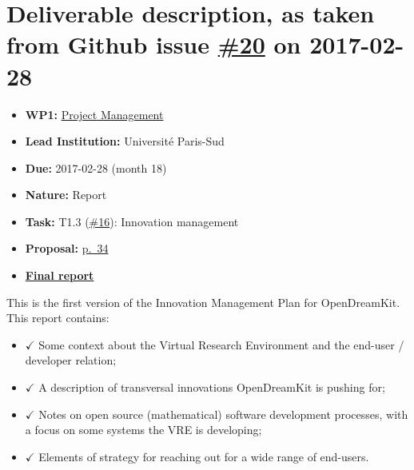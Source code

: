 \section*{\texorpdfstring{Deliverable description, as taken from Github
issue
\href{https://github.com/OpenDreamKit/OpenDreamKit/issues/20}{\#20} on
2017-02-28}{Deliverable description, as taken from Github issue \#20 on 2017-02-28}}\label{deliverable-description-as-taken-from-github-issue-20-on-2017-02-28}

\begin{itemize}
\tightlist
\item
  \textbf{WP1:}
  \href{https://github.com/OpenDreamKit/OpenDreamKit/tree/master/WP1}{Project
  Management}
\item
  \textbf{Lead Institution:} Université Paris-Sud
\item
  \textbf{Due:} 2017-02-28 (month 18)
\item
  \textbf{Nature:} Report
\item
  \textbf{Task:} T1.3
  (\href{https://github.com/OpenDreamKit/OpenDreamKit/issues/16}{\#16}):
  Innovation management
\item
  \textbf{Proposal:}
  \href{https://github.com/OpenDreamKit/OpenDreamKit/raw/master/Proposal/proposal-www.pdf}{p.~34}
\item
  \textbf{\href{https://github.com/OpenDreamKit/OpenDreamKit/raw/master/WP1/D1.4/report-final.pdf}{Final
  report}}
\end{itemize}

This is the first version of the Innovation Management Plan for
OpenDreamKit. This report contains:

\begin{itemize}
\tightlist
\item
  \(\checkmark\) Some context about the Virtual Research Environment and
  the end-user / developer relation;
\item
  \(\checkmark\) A description of transversal innovations OpenDreamKit
  is pushing for;
\item
  \(\checkmark\) Notes on open source (mathematical) software
  development processes, with a focus on some systems the VRE is
  developing;
\item
  \(\checkmark\) Elements of strategy for reaching out for a wide range
  of end-users.
\end{itemize}
